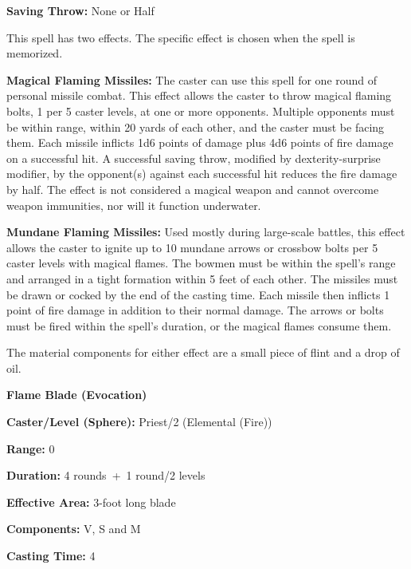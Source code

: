 \begin{multicols}{2}
\begin{minipage}{\columnwidth}
\noindent \textbf{Saving Throw:} None or Half

\end{minipage}

This spell has two effects.  The specific effect is chosen when the spell is memorized.

\textbf{Magical Flaming Missiles:} The caster can use this spell for one round of personal missile combat.  This effect allows the caster to throw magical flaming bolts, 1 per 5 caster levels, at one or more opponents.  Multiple opponents must be within range, within 20 yards of each other, and the caster must be facing them.  Each missile inflicts 1d6 points of damage plus 4d6 points of fire damage on a successful hit.  A successful saving throw, modified by dexterity-surprise modifier, by the opponent(s) against each successful hit reduces the fire damage by half.  The effect is not considered a magical weapon and cannot overcome weapon immunities, nor will it function underwater.

\textbf{Mundane Flaming Missiles:} Used mostly during large-scale battles, this effect allows the caster to ignite up to 10 mundane arrows or crossbow bolts per 5 caster levels with magical flames.  The bowmen must be within the spell's range and arranged in a tight formation within 5 feet of each other.  The missiles must be drawn or cocked by the end of the casting time.  Each missile then inflicts 1 point of fire damage in addition to their normal damage.  The arrows or bolts must be fired within the spell's duration, or the magical flames consume them.

The material components for either effect are a small piece of flint and a drop of oil.

\vspace{1em}

\noindent
\begin{minipage}{\columnwidth}

\noindent \textbf{Flame Blade (Evocation)}

\noindent \textbf{Caster/Level (Sphere):} Priest/2 (Elemental (Fire))

\noindent \textbf{Range:} 0

\noindent \textbf{Duration:} 4 rounds~+~1 round/2 levels

\noindent \textbf{Effective Area:} 3-foot long blade

\noindent \textbf{Components:} V, S and M

\noindent \textbf{Casting Time:} 4


\end{minipage}
\end{multicols}
